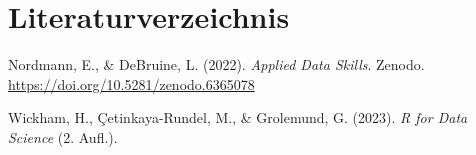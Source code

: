 \documentclass[
  letterpaper,
  DIV=11]{scrartcl}
\newlength{\cslhangindent}
\newlength{\cslentryspacingunit} %
\newenvironment{CSLReferences}[2] %
 {%
  \setlength{\parindent}{0pt}
  \ifodd #1
  \let\oldpar\par
  \def\par{\hangindent=\cslhangindent\oldpar}
  \fi
  \setlength{\parskip}{#2\cslentryspacingunit}
 }%
 {}
\theoremstyle{definition}
\theoremstyle{remark}
\begin{document}
\hypertarget{literaturverzeichnis}{%
\section*{Literaturverzeichnis}\label{literaturverzeichnis}}

\hypertarget{refs}{}
\begin{CSLReferences}{1}{0}
\leavevmode{}%
Nordmann, E., \& DeBruine, L. (2022). \emph{Applied Data Skills}.
Zenodo. \url{https://doi.org/10.5281/zenodo.6365078}

\leavevmode{}%
Wickham, H., Çetinkaya-Rundel, M., \& Grolemund, G. (2023). \emph{R for
{Data Science}} (2. Aufl.).

\end{CSLReferences}
\end{document}
